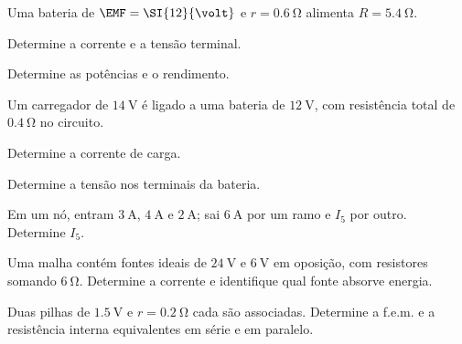 \blocoaplicacao
\begin{questao}[2]{}

Uma bateria de $\EMF=\SI{12}{\volt}$ e $r=\SI{0.6}{\ohm}$ alimenta
$R=\SI{5.4}{\ohm}$.
\begin{itensq}
\item Determine a corrente e a tensão terminal.
\item Determine as potências e o rendimento.
\end{itensq}


\end{questao}
\begin{questao}[2]{}

Um carregador de $\SI{14}{\volt}$ é ligado a uma bateria de
$\SI{12}{\volt}$, com resistência total de $\SI{0.4}{\ohm}$ no circuito.
\begin{itensq}
\item Determine a corrente de carga.
\item Determine a tensão nos terminais da bateria.
\end{itensq}


\end{questao}
\begin{questao}[2]{}

Em um nó, entram $\SI{3}{\ampere}$, $\SI{4}{\ampere}$ e $\SI{2}{\ampere}$;
sai $\SI{6}{\ampere}$ por um ramo e $I_5$ por outro. Determine $I_5$.


\end{questao}
\begin{questao}[2]{}

Uma malha contém fontes ideais de $\SI{24}{\volt}$ e $\SI{6}{\volt}$ em
oposição, com resistores somando $\SI{6}{\ohm}$. Determine a corrente e
identifique qual fonte absorve energia.


\end{questao}
\begin{questao}[2]{}

Duas pilhas de $\SI{1.5}{\volt}$ e $r=\SI{0.2}{\ohm}$ cada são associadas.
Determine a f.e.m. e a resistência interna equivalentes em série e em paralelo.


\end{questao}
